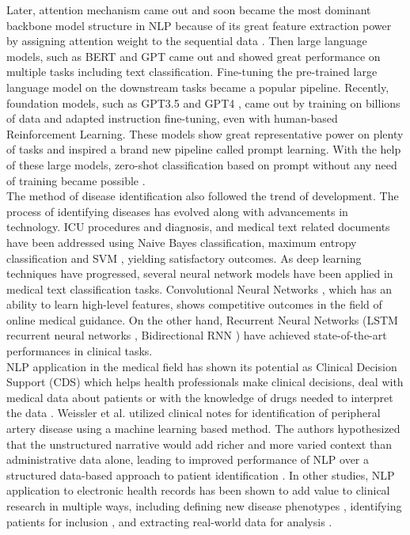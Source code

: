 \documentclass[11pt,a4paper]{article}
\begin{document}
\noindent Later, attention mechanism came out and soon became the most dominant backbone model structure  in NLP because of its great feature extraction power by assigning attention weight to the sequential data \cite{vaswani2017attention}. Then large language models, such as BERT \cite{devlin2019bert} and GPT \cite{Radford2018ImprovingLU} came out and showed great performance on multiple tasks including text classification. Fine-tuning the pre-trained large language model on the downstream tasks became a popular pipeline. Recently, foundation models, such as GPT3.5 \cite{brown2020language} and GPT4 \cite{openai2023gpt4}, came out by training on billions of data and adapted instruction fine-tuning, even with human-based Reinforcement Learning. These models show great representative power on plenty of tasks and inspired a brand new pipeline called prompt learning. With the help of these large models, zero-shot classification based on prompt without any need of training became possible \cite{gao2021making}.\\

\noindent The method of disease identification also followed the trend of development. The process of identifying diseases has evolved along with advancements in technology. ICU procedures and diagnosis, and medical text related documents have been addressed using Naive Bayes classification, maximum entropy classification \cite{tripathy2017document} and SVM \cite{marafino2014n}, yielding satisfactory outcomes. As deep learning techniques have progressed, several neural network models have been applied in medical text classification tasks. Convolutional Neural Networks \cite{hughes2017medical}, which has an ability to learn high-level features, shows competitive outcomes in the field of online medical guidance. On the other hand, Recurrent Neural Networks (LSTM recurrent neural networks \cite{lipton2015learning}, Bidirectional RNN \cite{jagannatha2016bidirectional}) have achieved state-of-the-art performances in clinical tasks.\\

\noindent NLP application in the medical field has shown its potential as Clinical Decision Support (CDS) which helps health professionals make clinical decisions, deal with medical data about patients or with the knowledge of drugs needed to interpret the data \cite{DBLP:journals/corr/abs-1802-05365}. Weissler et al. utilized clinical notes for identification of peripheral artery disease using a machine learning based method. The authors hypothesized that the unstructured narrative would add richer and more varied context than administrative data alone, leading to improved performance of NLP over a structured data-based approach to patient identification \cite{wei1}. In other studies, NLP application to electronic health records has been shown to add value to clinical research in multiple ways, including defining new disease phenotypes \cite{doi:10.1126/scitranslmed.aaa9364}, identifying patients for inclusion \cite{HASSANZADEH2020103406}, and extracting real-world data for analysis \cite{Fonferko-Shadrache023232}.\\
\end{document}
